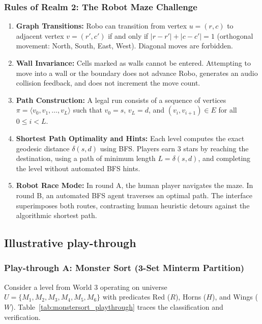 \documentclass[11pt,a4paper]{article}
\begin{document}
\subsubsection*{Rules of Realm 2: The Robot Maze Challenge}
\begin{enumerate}
  \item \textbf{Graph Transitions:} Robo can transition from vertex $u = (r, c)$ to adjacent vertex $v = (r', c')$ if and only if $|r - r'| + |c - c'| = 1$ (orthogonal movement: North, South, East, West). Diagonal moves are forbidden.
  \item \textbf{Wall Invariance:} Cells marked as walls cannot be entered. Attempting to move into a wall or the boundary does not advance Robo, generates an audio collision feedback, and does not increment the move count.
  \item \textbf{Path Construction:} A legal run consists of a sequence of vertices $\pi = \langle v_0, v_1, \dots, v_L \rangle$ such that $v_0 = s$, $v_L = d$, and $(v_i, v_{i+1}) \in E$ for all $0 \le i < L$.
  \item \textbf{Shortest Path Optimality and Hints:} Each level computes the exact geodesic distance $\delta(s, d)$ using BFS. Players earn 3 stars by reaching the destination, using a path of minimum length $L = \delta(s, d)$, and completing the level without automated BFS hints.
  \item \textbf{Robot Race Mode:} In round A, the human player navigates the maze. In round B, an automated BFS agent traverses an optimal path. The interface superimposes both routes, contrasting human heuristic detours against the algorithmic shortest path.
\end{enumerate}

\subsection{Illustrative play-through}

\subsubsection*{Play-through A: Monster Sort (3-Set Minterm Partition)}
Consider a level from World 3 operating on universe $U = \{M_1, M_2, M_3, M_4, M_5, M_6\}$ with predicates Red ($R$), Horns ($H$), and Wings ($W$). Table~\ref{tab:monstersort_playthrough} traces the classification and verification.
\end{document}
